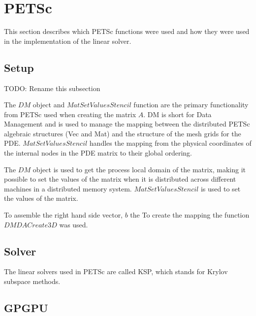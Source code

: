 \section{PETSc}

This section describes which PETSc functions were used and how they were used in 
the implementation of the linear solver\cite{petsc-user-ref}. 

\subsection{Setup}

TODO: Rename this subsection

The $DM$ object and $MatSetValuesStencil$ function are the primary functionality from 
PETSc used when creating the matrix $A$\cite{petsc-user-ref}. DM is short for 
Data Management and is used to manage the mapping between the distributed PETSc 
algebraic structures (Vec and Mat) and the structure of the mesh grids for the PDE. 
$MatSetValuesStencil$ handles the mapping from the physical coordinates of the 
internal nodes in the PDE matrix to their global ordering. 

The $DM$ object is used to get the process local domain of the matrix, 
making it possible to set the values of the matrix when it is distributed across 
different machines in a distributed memory system. $MatSetValuesStencil$ is used 
to set the values of the matrix.

To assemble the right hand side vector, $b$ the To create the mapping the function 
$DMDACreate3D$ was used.

\subsection{Solver}

The linear solvers used in PETSc are called KSP, which stands for Krylov subspace 
methods. 

\subsection{GPGPU}
